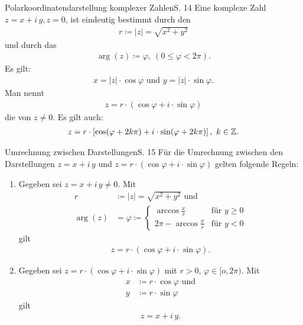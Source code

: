\begin{bemerkung}{Polarkoordinatendarstellung komplexer Zahlen}{S. 14}
  Eine komplexe Zahl $z = x + i \, y, z = 0$, ist eindeutig bestimmt durch den 
  \begin{align}
    r \coloneqq |z| = \sqrt{x^2 + y^2}
  \end{align}
  und durch das 
  \begin{align}
    \operatorname{arg}(z) \coloneqq \varphi, \ (0 \leq \varphi < 2\pi).
  \end{align}
  Es gilt:
  \begin{align}
    x = |z| \cdot \cos\varphi \text{ und } y = |z| \cdot \sin\varphi .
  \end{align}
  Man nennt
  \begin{align}
    z = r \cdot \left( \cos\varphi + i \cdot \sin\varphi \right)
  \end{align}
  die  von $z \neq 0$.
  Es gilt auch:
  \begin{align}
    z = r \cdot \left[ \cos (\varphi + 2 k \pi) + i \cdot \sin (\varphi + 2 k \pi) \right],\ k \in \mathbb{Z} .
  \end{align}
\end{bemerkung}

\begin{bemerkung}{Umrechnung zwischen Darstellungen}{S. 15}
  Für die Umrechnung zwischen den Darstellungen $z = x + i \, y$ und $z = r \cdot \left( \cos\varphi + i \cdot \sin\varphi \right)$ gelten folgende Regeln:
  \begin{enumerate}
    \item Gegeben sei $z = x + i \, y \neq 0$.
      Mit
      \begin{align}
        r &\coloneqq |z| = \sqrt{x^2 + y^2} \text{ und}\\
        \operatorname{arg}(z) &= \varphi \coloneqq
          \begin{cases}
            \arccos \frac{x}{r} & \text{für } y \geq 0\\
            2 \pi - \arccos \frac{x}{r} & \text{für } y < 0
          \end{cases}
      \end{align}
      gilt
      \begin{align}
        z = r \cdot \left( \cos\varphi + i \cdot \sin\varphi \right) .
      \end{align}
    \item Gegeben sei $z = r \cdot \left( \cos\varphi + i \cdot \sin\varphi \right)$ mit $r > 0$, $\varphi \in [o,2\pi)$.
      Mit
      \begin{align}
        x &\coloneqq r \cdot \cos \varphi \text{ und}\\
        y &\coloneqq r \cdot \sin \varphi
      \end{align}
      gilt
      \begin{align}
        z = x + i \, y .
      \end{align}
  \end{enumerate}
\end{bemerkung}

